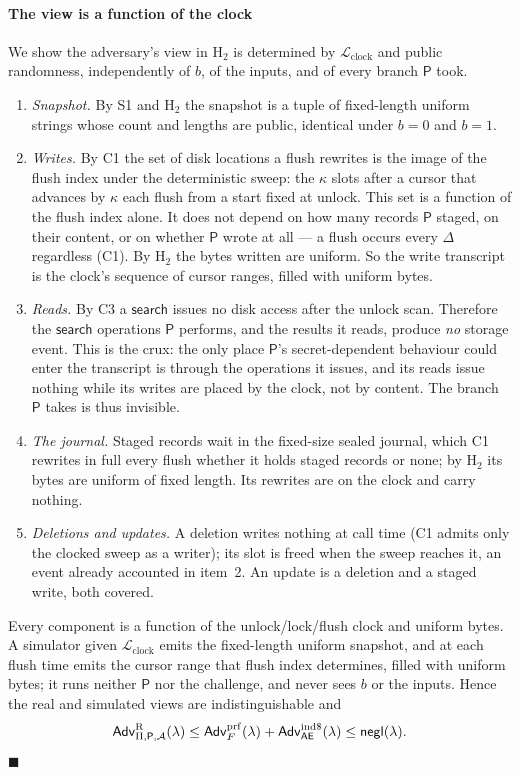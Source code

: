 \paragraph{The view is a function of the clock} We show the adversary's view in $\mathrm{H}_2$ is
determined by $\mathcal{L}_{\mathrm{clock}}$ and public randomness, independently of $b$, of the
inputs, and of every branch $\mathsf{P}$ took.

\begin{enumerate}
\item \emph{Snapshot.} By S1 and $\mathrm{H}_2$ the snapshot is a tuple of fixed-length uniform
strings whose count and lengths are public, identical under $b=0$ and $b=1$.
\item \emph{Writes.} By C1 the set of disk locations a flush rewrites is the image of the flush index
under the deterministic sweep: the $\kappa$ slots after a cursor that advances by $\kappa$ each flush from a
start fixed at unlock. This set is a function of the flush index alone. It does not depend on how many
records $\mathsf{P}$ staged, on their content, or on whether $\mathsf{P}$ wrote at all --- a flush
occurs every $\Delta$ regardless (C1). By $\mathrm{H}_2$ the bytes written are uniform. So the write
transcript is the clock's sequence of cursor ranges, filled with uniform bytes.
\item \emph{Reads.} By C3 a $\mathsf{search}$ issues no disk access after the unlock scan. Therefore
the $\mathsf{search}$ operations $\mathsf{P}$ performs, and the results it reads, produce \emph{no}
storage event. This is the crux: the only place $\mathsf{P}$'s secret-dependent behaviour could enter
the transcript is through the operations it issues, and its reads issue nothing while its writes are
placed by the clock, not by content. The branch $\mathsf{P}$ takes is thus invisible.
\item \emph{The journal.} Staged records wait in the fixed-size sealed journal, which C1 rewrites in
full every flush whether it holds staged records or none; by $\mathrm{H}_2$ its bytes are uniform of
fixed length. Its rewrites are on the clock and carry nothing.
\item \emph{Deletions and updates.} A deletion writes nothing at call time (C1 admits only the
clocked sweep as a writer); its slot is freed when the sweep reaches it, an event already accounted
in item~2. An update is a deletion and a staged write, both covered.
\end{enumerate}

Every component is a function of the unlock/lock/flush clock and uniform bytes. A simulator given
$\mathcal{L}_{\mathrm{clock}}$ emits the fixed-length uniform snapshot, and at each flush time emits
the cursor range that flush index determines, filled with uniform bytes; it runs neither $\mathsf{P}$
nor the challenge, and never sees $b$ or the inputs. Hence the real and simulated views are
indistinguishable and
\[
\mathsf{Adv}^{\mathrm{R}}_{\Pi,\mathsf{P},\mathcal{A}}(\lambda) \le \mathsf{Adv}^{\mathrm{prf}}_F(\lambda) +
\mathsf{Adv}^{\mathrm{ind\$}}_{\mathsf{AE}}(\lambda) \le \mathsf{negl}(\lambda).
\]
\hfill$\blacksquare$

